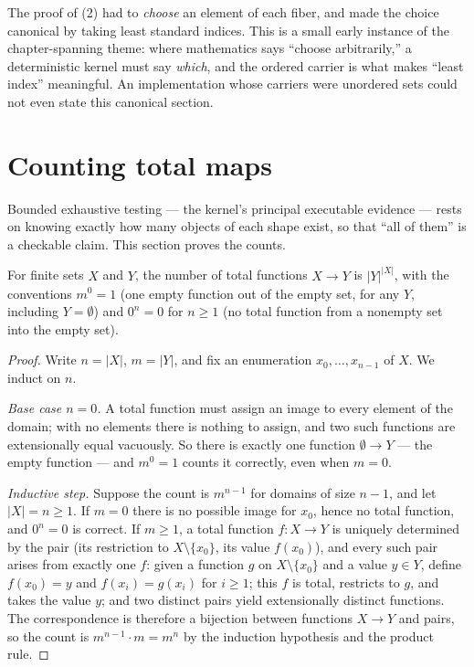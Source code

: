 \begin{remark}\label{ch02:rem:section-choice}
The proof of (2) had to \emph{choose} an element of each fiber, and made
the choice canonical by taking least standard indices. This is a small
early instance of the chapter-spanning theme: where mathematics says
``choose arbitrarily,'' a deterministic kernel must say \emph{which}, and
the ordered carrier is what makes ``least index'' meaningful. An
implementation whose carriers were unordered sets could not even state
this canonical section.
\end{remark}

\section{Counting total maps}\label{ch02:sec:counting}

Bounded exhaustive testing --- the kernel's principal executable evidence
--- rests on knowing exactly how many objects of each shape exist, so that
``all of them'' is a checkable claim. This section proves the counts.

\begin{theorem}\label{ch02:thm:count-maps}
For finite sets $X$ and $Y$, the number of total functions $X \to Y$ is
$|Y|^{|X|}$, with the conventions $m^0 = 1$ (one empty function out of the
empty set, for any $Y$, including $Y = \emptyset$) and $0^n = 0$ for
$n \geq 1$ (no total function from a nonempty set into the empty set).
\end{theorem}

\begin{proof}
Write $n = |X|$, $m = |Y|$, and fix an enumeration
$x_0, \dots, x_{n-1}$ of $X$. We induct on $n$.

\emph{Base case $n = 0$.} A total function must assign an image to every
element of the domain; with no elements there is nothing to assign, and two
such functions are extensionally equal vacuously. So there is exactly one
function $\emptyset \to Y$ --- the empty function --- and $m^0 = 1$ counts
it correctly, even when $m = 0$.

\emph{Inductive step.} Suppose the count is $m^{n-1}$ for domains of size
$n - 1$, and let $|X| = n \geq 1$. If $m = 0$ there is no possible image
for $x_0$, hence no total function, and $0^n = 0$ is correct. If
$m \geq 1$, a total function $f : X \to Y$ is uniquely determined by the
pair (its restriction to $X \setminus \{x_0\}$, its value $f(x_0)$), and
every such pair arises from exactly one $f$: given a function $g$ on
$X \setminus \{x_0\}$ and a value $y \in Y$, define $f(x_0) = y$ and
$f(x_i) = g(x_i)$ for $i \geq 1$; this $f$ is total, restricts to $g$, and
takes the value $y$; and two distinct pairs yield extensionally distinct
functions. The correspondence is therefore a bijection between functions
$X \to Y$ and pairs, so the count is
$m^{n-1} \cdot m = m^n$ by the induction hypothesis and the product rule.
\end{proof}

